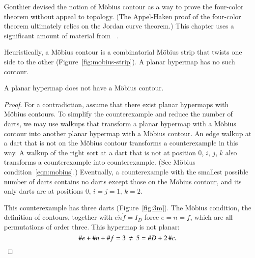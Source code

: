 \begin{remark}
Gonthier devised the notion of M\"obius contour as a way to prove
the four-color theorem without appeal to topology.  (The Appel-Haken
proof of the four-color theorem ultimately relies on the Jordan curve theorem.)
This chapter uses a significant amount of material from ~\cite{Gonthier:2005:FourColor}.
\end{remark}

\figMSWJHND %


\figIWKICBI %


\begin{remark}
 Heuristically, a M\"obius contour is a 
combinatorial M\"obius strip that
twists one side to the other (Figure~\ref{fig:mobius-strip}).  
A planar hypermap has no such contour.  
\end{remark}

\figOOXPORQ %


\begin{lemma}\label{lemma:no-mobius}
A planar hypermap does not have a M\"obius contour.
\end{lemma}
%

\begin{proof} For a contradiction, assume that there exist planar
  hypermaps with M\"obius contours.  To simplify the counterexample
  and reduce the number of darts, we may use walkups that transform a
  planar hypermap with a M\"obius contour into another planar hypermap
  with a M\"obius contour.  An edge walkup at a dart that is not on
  the M\"obius contour transforms a counterexample in this way.  A
  walkup of the right sort at a dart that is not at position $0$, $i$,
  $j$, $k$ also transforms a counterexample into counterexample.  (See
  M\"obius condition~\ref{eqn:mobius}.)
%
Eventually, a counterexample with
the smallest possible number of darts contains no
darts except those on the M\"obius contour, and its only darts
are at positions $0$, $i=j=1$, $k=2$.

This counterexample has three darts (Figure~\ref{fig:3m}).  
The M\"obius condition, the
definition of contours, together with $e\ocirc n\ocirc f=I_D$ force
$e=n=f$, which are all permutations of order three.  This hypermap is not planar:
\[
\# e + \# n + \# f = 3\,\ne\, 5 = \# D + 2\,
\#c.\qedhere
\]
\end{proof}



